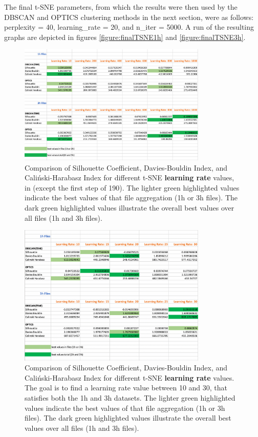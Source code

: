 The final t-SNE parameters, from which the results were then used by the DBSCAN and OPTICS clustering methods in the next section, were as follows: perplexity = 40, learning\_rate = 20, and n\_iter = 5000. A run of the resulting graphs are depicted in figures \ref{figure:finalTSNE1h} and \ref{figure:finalTSNE3h}.


\begin{figure}
  \centering
  \includegraphics[width=0.8\textwidth]{./images/tsneParametersTest/learningRate/learningRateEvaluationScores.png}
  \caption{Comparison of Silhouette Coefficient, Davies-Bouldin Index, and Caliński-Harabasz Index for different t-SNE \textbf{learning rate} values, in  (except the first step of 190). The lighter green highlighted values indicate the best values of that file aggregation (1h or 3h files). The dark green highlighted values illustrate the overall best values over all files (1h and 3h files).}
  \label{figure:learningRateEvaluationScores}
\end{figure}


\begin{figure}
  \centering
  \includegraphics[width=0.8\textwidth]{./images/tsneParametersTest/learningRate/learningRateEvaluationScoresDetailed3.png}
  \caption{Comparison of Silhouette Coefficient, Davies-Bouldin Index, and Caliński-Harabasz Index for different t-SNE \textbf{learning rate} values. The goal is to find a learning rate value between 10
  and 30, that satisfies both the 1h and 3h datasets. The lighter green highlighted values indicate the best values of that file aggregation (1h or 3h files). The dark green highlighted values illustrate the overall best values over all files (1h and 3h files).}
  \label{figure:learningRateEvaluationScoresDetailed3}
\end{figure}



